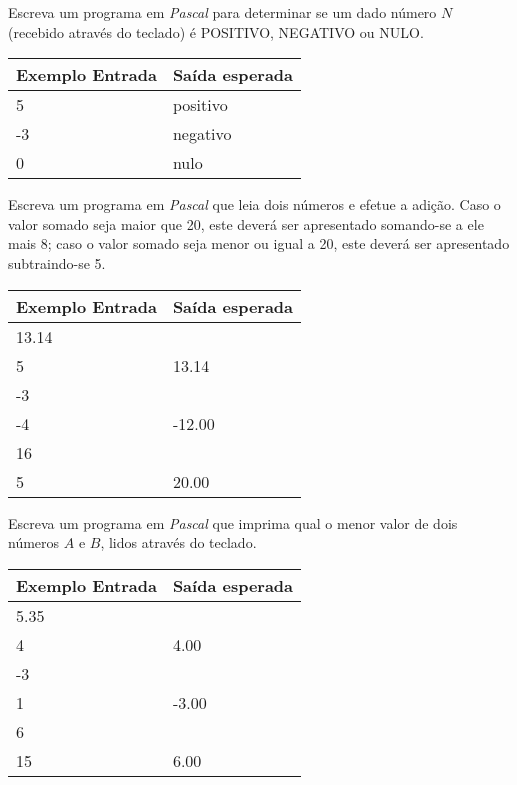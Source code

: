 \item Escreva um programa em \emph{Pascal} para determinar se um dado número 
$N$ (recebido através do teclado) é POSITIVO, NEGATIVO ou NULO.

\begin{center}
\begin{tabular}{|l|l|} \hline
Exemplo Entrada & Saída esperada \\ \hline
5               & positivo               \\ \hline
-3              & negativo               \\ \hline
0               & nulo               \\ \hline
\end{tabular}
\end{center}

\item Escreva um programa em \emph{Pascal} que leia dois números e efetue a 
adição. Caso o valor somado seja maior que 20, este deverá ser apresentado 
somando-se a ele mais 8; caso o valor somado seja menor ou igual a 20, 
este deverá ser apresentado subtraindo-se 5.

\begin{center}
\begin{tabular}{|l|l|} \hline
Exemplo Entrada & Saída esperada \\ \hline
13.14                &                \\
5                &    13.14            \\ \hline
-3                &                \\
-4                &   -12.00             \\ \hline
16                &                \\
5                &    20.00            \\ \hline
\end{tabular}
\end{center}

\item Escreva um programa em \emph{Pascal} que imprima qual o menor valor de 
dois números $A$ e $B$, lidos através do teclado.

\begin{center}
\begin{tabular}{|l|l|} \hline
Exemplo Entrada & Saída esperada \\ \hline
5.35                &                \\
4                & 4.00               \\ \hline
-3                &                \\
1                & -3.00               \\ \hline
6                &                \\ 
15                & 6.00               \\ \hline
\end{tabular}
\end{center}

